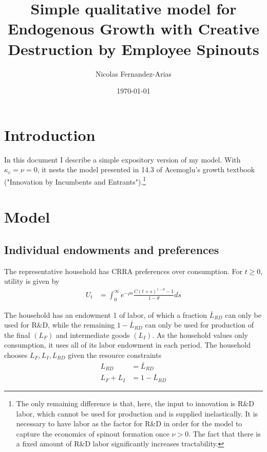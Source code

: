 \documentclass[12pt,english]{article}
\theoremstyle{remark}
\begin{document}
	
\title{Simple qualitative model for Endogenous Growth with Creative Destruction by Employee Spinouts}
\author{Nicolas Fernandez-Arias}
\date{\today}
\maketitle

\section{Introduction}

In this document I describe a simple expository version of my model.  With $\kappa_e = \nu = 0$, it nests the model presented in 14.3 of Acemoglu's growth textbook ("Innovation by Incumbents and Entrants").\footnote{The only remaining difference is that, here, the input to innovation is R\&D labor, which cannot be used for production and is supplied inelastically. It is necessary to have labor as the factor for R\&D in order for the model to capture the economics of spinout formation once $\nu > 0$. The fact that there is a fixed amount of R\&D labor significantly increases tractability.}

\section{Model}

\subsection{Individual endowments and preferences}

The representative household has CRRA preferences over consumption. For $t \ge 0$, utility is given by 
\begin{align}
U_t &= \int_0^{\infty} e^{-\rho s} \frac{C(t+s)^{1-\theta} - 1}{1-\theta} ds \label{preferences}
\end{align}

The household has an endowment 1 of labor, of which a fraction $\bar{L}_{RD}$ can only be used for R\&D, while the remaining $1 - \bar{L}_{RD}$ can only be used for production of the final $(L_F)$ and intermediate goods $(L_I)$. As the household values only consumption, it uses all of its labor endowment in each period. The household chooses $L_F,L_I,L_{RD}$ given the resource constraints
\begin{align}
L_{RD} &= \bar{L}_{RD} \label{labor_resource_constraint2} \\
L_F + L_I &= 1 - \bar{L}_{RD} \label{labor_resource_constraint} 
\end{align}
\end{document}
